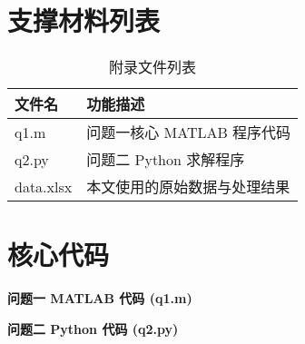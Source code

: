 \documentclass[withoutpreface,notoc]{cumcmthesis}
\begin{document}
	\newpage
	\begin{appendices}
		\section{支撑材料列表}
		\begin{table}[H]
			\centering
			\caption{附录文件列表}
			\label{tab:文件列表}
			\begin{tabularx}{\textwidth}{LL}
				\toprule
				文件名 & 功能描述 \\
				\midrule
				q1.m & 问题一核心 MATLAB 程序代码 \\
				q2.py & 问题二 Python 求解程序 \\
				data.xlsx & 本文使用的原始数据与处理结果 \\
				\bottomrule
			\end{tabularx}
		\end{table}
		
		\section{核心代码}
		\noindent\textbf{问题一 MATLAB 代码 (q1.m)}
		
		
		\noindent\textbf{问题二 Python 代码 (q2.py)}
		
		
	\end{appendices}
	
\end{document}
